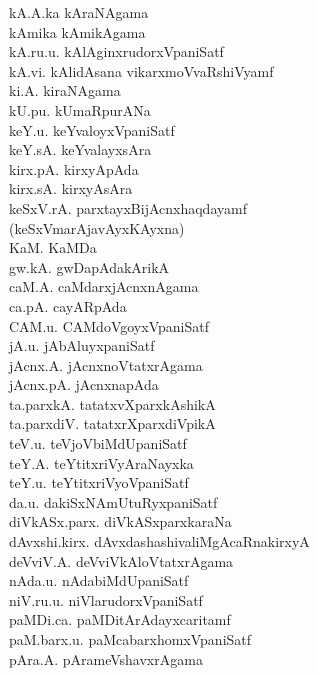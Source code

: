 {\begin{multicols}{2}
\begin{tabbing}
kA.A.ka \> kAraNAgama\\[2pt]
kAmika \> kAmikAgama\\[2pt]
kA.ru.u. \> kAlAginxrudorxVpaniSatf\\[2pt]
kA.vi. \> kAlidAsana vikarxmoVvaRshiVyamf\\[2pt]
ki.A. \> kiraNAgama\\[2pt]
kU.pu. \> kUmaRpurANa\\[2pt]
keY.u. \> keYvaloyxVpaniSatf\\[2pt]
keY.sA. \> keYvalayxsAra\\[2pt]
kirx.pA. \> kirxyApAda\\[2pt]
kirx.sA. \> kirxyAsAra\\[2pt]
keSxV.rA. \> parxtayxBijAcnxhaqdayamf\\[2pt]
(keSxVmarAjavAyxKAyxna) \> \\[2pt]
KaM. \> KaMDa\\[2pt]
gw.kA. \> gwDapAdakArikA\\[2pt]
caM.A. \> caMdarxjAcnxnAgama\\[2pt]
ca.pA. \> cayARpAda\\[2pt]
CAM.u. \> CAMdoVgoyxVpaniSatf\\[2pt]
jA.u. \> jAbAluyxpaniSatf\\[2pt]
jAcnx.A. \> jAcnxnoVtatxrAgama\\[2pt]
jAcnx.pA. \> jAcnxnapAda\\[2pt]
ta.parxkA. \> tatatxvXparxkAshikA\\[2pt]
ta.parxdiV. \> tatatxrXparxdiVpikA\\[2pt]
teV.u. \> teVjoVbiMdUpaniSatf\\[2pt]
teY.A. \> teYtitxriVyAraNayxka\\[2pt]
teY.u. \> teYtitxriVyoVpaniSatf\\[2pt]
da.u. \> dakiSxNAmUtuRyxpaniSatf\\[2pt]
diVkASx.parx. \> diVkASxparxkaraNa\\[2pt]
dAvxshi.kirx. \> dAvxdashashivaliMgAcaRnakirxyA\\[2pt]
deVviV.A. \> deVviVkAloVtatxrAgama\\[2pt]
nAda.u. \> nAdabiMdUpaniSatf\\[2pt]
niV.ru.u. \> niVlarudorxVpaniSatf\\[2pt]
paMDi.ca. \> paMDitArAdayxcaritamf\\[2pt]
paM.barx.u. \> paMcabarxhomxVpaniSatf\\[2pt]
pAra.A. \> pArameVshavxrAgama\\[2pt]

\end{tabbing}
\end{multicols}}
